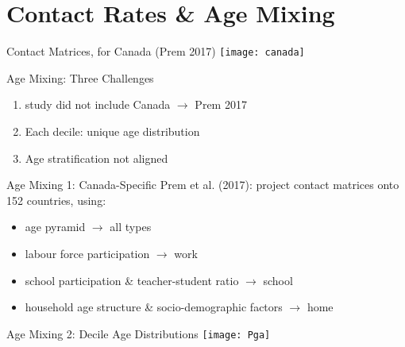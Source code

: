 \section{Contact Rates \& Age Mixing}
\begin{frame}{\Polymod Contact Matrices, for Canada (Prem 2017)}
  \centering\texttt{[image: canada]}
\end{frame}
\begin{frame}{Age Mixing: Three Challenges}
  \begin{enumerate}
    \item \Polymod study did not include Canada $\rightarrow$ Prem 2017
    \item Each decile: unique age distribution
    \item Age stratification not aligned
  \end{enumerate}
\end{frame}
\begin{frame}{Age Mixing 1: Canada-Specific}
  Prem et al. (2017): project \polymod contact matrices onto 152 countries, using:
  \begin{itemize}
    \item age pyramid $\rightarrow$ all types
    \item labour force participation $\rightarrow$ work
    \item school participation \& teacher-student ratio $\rightarrow$ school
    \item household age structure \& socio-demographic factors $\rightarrow$ home
  \end{itemize}
\end{frame}
\begin{frame}{Age Mixing 2: Decile Age Distributions}
  \centering\texttt{[image: Pga]}
\end{frame}
